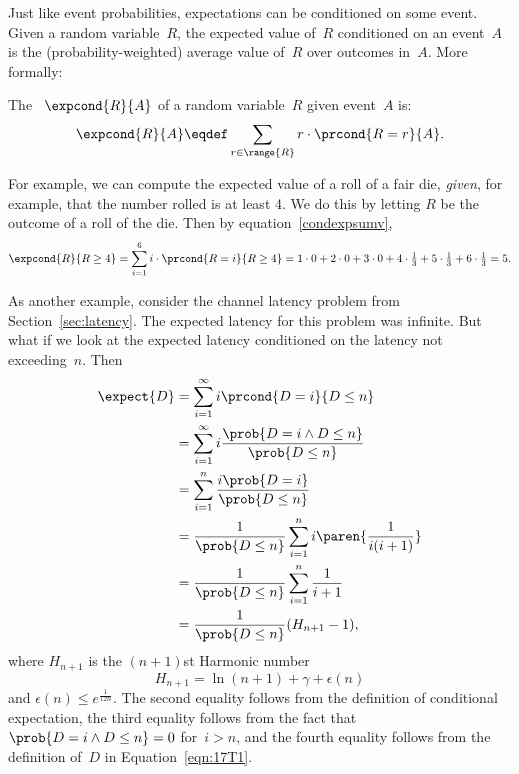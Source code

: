 Just like event probabilities, expectations can be conditioned on some
event.  Given a random variable~$R$, the expected value of~$R$
conditioned on an event~$A$ is the (probability-weighted) average
value of~$R$ over outcomes in~$A$.  More formally:
\begin{definition}\label{condexpdef}
The ~$\expcond{R}{A}$ of a random
variable~$R$ given event~$A$ is:
\begin{equation}\label{condexpsumv}
\expcond{R}{A} \eqdef \sum_{r \in \range{R}} r \cdot\prcond{R=r}{A}.
\end{equation}
\end{definition}

For example, we can compute the expected value of a roll of a fair die,
\emph{given}, for example, that the number rolled is at least 4.  We do
this by letting $R$ be the outcome of a roll of the die.  Then
by equation~\eqref{condexpsumv},
\[
\expcond{R}{R \geq 4} = \sum_{i=1}^6 i \cdot \prcond{R=i}{R \ge 4}
= 1\cdot 0 + 2\cdot 0 + 3\cdot 0 +
  4\cdot\tfrac{1}{3} + 5\cdot\tfrac{1}{3} + 6\cdot\tfrac{1}{3}
= 5.
\]

As another example, consider the channel latency problem from
Section~\ref{sec:latency}.  The expected latency for this problem was
infinite.  But what if we look at the expected latency conditioned on
the latency not exceeding~$n$.  Then
\begin{align*}
\expect{D}
    &= \sum_{i = 1}^\infty i \prcond{D = i}{D \le n} \\
    &= \sum_{i = 1}^\infty i \frac{\prob{D = i \land D \le n}}
                                  {\prob{D \le n}} \\
    &= \sum_{i = 1}^n \frac{i \prob{D = i}}{\prob{D \le n}} \\
    &= \frac{1}{\prob{D \le n}} \sum_{i = 1}^n i \paren{\frac{1}{i(i + 1)}}\\
    &= \frac{1}{\prob{D \le n}} \sum_{i = 1}^n \frac{1}{i + 1} \\
    &= \frac{1}{\prob{D \le n}} (H_{n+ 1} - 1),
\end{align*}
where $H_{n + 1}$ is the $(n + 1)$st Harmonic number
\begin{equation*}
    H_{n + 1} = \ln(n + 1) + \gamma + \epsilon(n)
\end{equation*}
and $\epsilon(n) \le e^{\frac{1}{12n}}$.  The second equality follows from
the definition of conditional expectation, the third equality follows
from the fact that $\prob{D = i \land D \le n} = 0$ for~$i > n$, and
the fourth equality follows from the definition of~$D$ in
Equation~\ref{eqn:17T1}.

